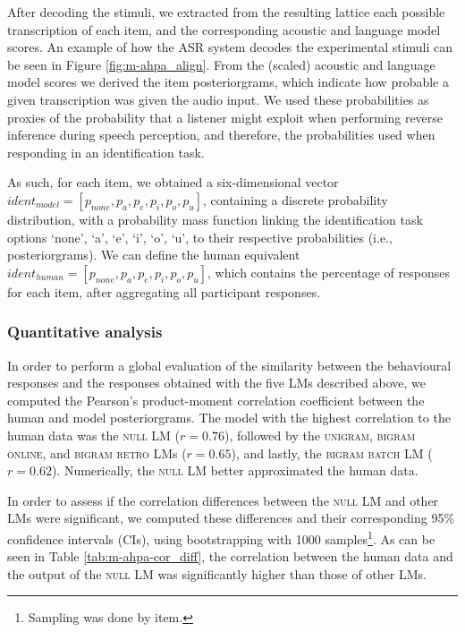 {After decoding the stimuli, we extracted from the resulting lattice each possible transcription of each item, and the corresponding acoustic and language model scores. An example of how the ASR system decodes the experimental stimuli can be seen in Figure \ref{fig:m-ahpa_align}. From the (scaled) acoustic and language model scores we derived the item posteriorgrams, which indicate how probable a given transcription was given the audio input. We used these probabilities as proxies of the probability that a listener might exploit when performing reverse inference during speech perception, and therefore, the probabilities used when responding in an identification task. 

As such, for each item, we obtained a six-dimensional vector $ident_{model} = [p_{none}, p_{a}, p_{e}, p_{i}, p_{o}, p_{u}]$, containing a discrete probability distribution, with a probability mass function linking the identification task options `none', `a', `e', `i', `o', `u', to their respective probabilities (i.e., posteriorgrams).
We can define the human equivalent $ident_{human} = [p_{none}, p_{a}, p_{e}, p_{i}, p_{o}, p_{u}]$, which contains the percentage of responses for each item, after aggregating all participant responses. 

\subsubsection{Quantitative analysis}
In order to perform a global evaluation of the similarity between the behavioural responses and the responses obtained with the five LMs described above, we computed the Pearson's product-moment correlation coefficient between the human and model posteriorgrams. The model with the highest correlation to the human data was the \textsc{null} LM ($r = 0.76$), followed by the \textsc{unigram}, \textsc{bigram online}, and \textsc{bigram retro} LMs ($r = 0.65$), and lastly, the \textsc{bigram batch} LM ($r = 0.62$). Numerically, the \textsc{null} LM better approximated the human data.

In order to assess if the correlation differences between the \textsc{null} LM and other LMs were significant, we computed these differences and their corresponding 95\% confidence intervals (CIs), using bootstrapping with 1000 samples\footnote{Sampling was done by item.}. As can be seen in Table \ref{tab:m-ahpa-cor_diff}, the correlation between the human data and the output of the \textsc{null} LM was significantly higher than those of other LMs.

}
